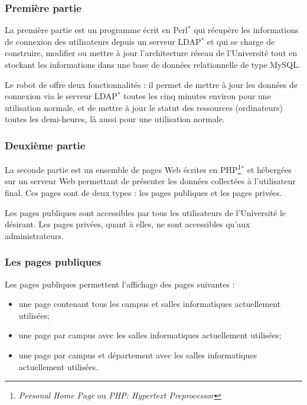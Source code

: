 \subsubsection{Premi\`ere partie}

La premi\`ere partie est un programme \'ecrit en Perl$^*$ qui r\'ecup\`ere les informations de connexion des utilisateurs depuis un serveur LDAP$^*$ et qui se charge de construire, modifier ou mettre \`a jour l'architecture r\'eseau de l'Universit\'e tout en stockant les informations dans une base de donn\'ees relationnelle de type MySQL.

Le robot de \Yuukou{} offre deux fonctionnalit\'es : il permet de mettre \`a jour les donn\'ees de connexion via le serveur LDAP$^*$ toutes les cinq minutes environ pour une utilisation normale, et de mettre \`a jour le statut des ressources (ordinateurs) toutes les demi-heures, l\`a aussi pour une utilisation normale.

\subsubsection{Deuxi\`eme partie}

La seconde partie est un ensemble de pages Web \'ecrites en PHP\protect\footnote{\textit{Personal Home Page} ou \textit{PHP: Hypertext Preprocessor}}$^*$ et h\'eberg\'ees sur un serveur Web permettant de pr\'esenter les donn\'ees collect\'ees \`a l'utilisateur final.
Ces pages sont de deux types : les pages publiques et les pages priv\'ees.

Les pages publiques sont accessibles par tous les utilisateurs de l'Universit\'e le d\'esirant.
Les pages priv\'ees, quant \`a elles, ne sont accessibles qu'aux administrateurs.

\subsubsection{Les pages publiques}

\noindent Les pages publiques permettent l'affichage des pages suivantes :

\begin{itemize}
	\item une page contenant tous les campus et salles informatiques actuellement utilis\'ees;
	\item une page par campus avec les salles informatiques actuellement utilis\'ees;
	\item une page par campus et d\'epartement avec les salles informatiques actuellement utilis\'ees.

\end{itemize}

